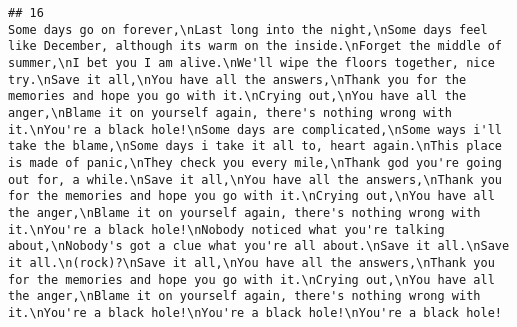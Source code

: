 \documentclass[]{article}
\begin{document}
\begin{verbatim}
## 16                                                                                                                                                                                                                                                                                                                                                                                                                                                                                                                                                                                                                                                                                                                                                                                                                                                                                                                                                                                                                                                                                                                                                                                                                                                                                                                                                                                                                                                                                                                                                                                                                                                                                                                                                                                                                                                                   Some days go on forever,\nLast long into the night,\nSome days feel like December, although its warm on the inside.\nForget the middle of summer,\nI bet you I am alive.\nWe'll wipe the floors together, nice try.\nSave it all,\nYou have all the answers,\nThank you for the memories and hope you go with it.\nCrying out,\nYou have all the anger,\nBlame it on yourself again, there's nothing wrong with it.\nYou're a black hole!\nSome days are complicated,\nSome ways i'll take the blame,\nSome days i take it all to, heart again.\nThis place is made of panic,\nThey check you every mile,\nThank god you're going out for, a while.\nSave it all,\nYou have all the answers,\nThank you for the memories and hope you go with it.\nCrying out,\nYou have all the anger,\nBlame it on yourself again, there's nothing wrong with it.\nYou're a black hole!\nNobody noticed what you're talking about,\nNobody's got a clue what you're all about.\nSave it all.\nSave it all.\n(rock)?\nSave it all,\nYou have all the answers,\nThank you for the memories and hope you go with it.\nCrying out,\nYou have all the anger,\nBlame it on yourself again, there's nothing wrong with it.\nYou're a black hole!\nYou're a black hole!\nYou're a black hole!

\end{verbatim}
\end{document}
